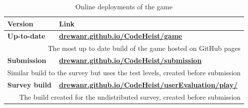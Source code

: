 \begin{table}[H]
    \begin{tabularx}{1.0\textwidth} { 
       l>{\raggedleft\arraybackslash}X  }
         Version & Link\\\toprule
         \textbf{Up-to-date} & \textbf{\href{https://drewanr.github.io/CodeHeist/game}{drewanr.github.io/CodeHeist/game}}\\
         \multicolumn{2}{r}{The most up to date build of the game hosted on GitHub pages}\\
         \textbf{Submission}&  \textbf{\href{https://drewanr.github.io/CodeHeist/submission}{drewanr.github.io/CodeHeist/submission}}\\
         \multicolumn{2}{r}{Similar build to the survey but uses the test levels, created before submission}\\
         \textbf{Survey build}&  \textbf{\href{https://drewanr.github.io/CodeHeist/userEvaluation/play/}{drewanr.github.io/CodeHeist/userEvaluation/play/}}\\
         \multicolumn{2}{r}{The build created for the undistributed survey, created before submission}\\
         \bottomrule
    \end{tabularx}
    \label{tab:deployment_table}
    \caption{Online deployments of the game}
\end{table}

